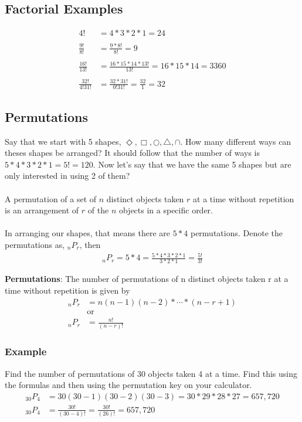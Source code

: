 \documentclass[14pt]{extarticle}
\begin{document}
\subsection{Factorial Examples}
\begin{align*}
	4! &= 4*3*2*1 = 24 \\\\
	\frac{9!}{8!} &= \frac{9*8!}{8!} = 9 \\\\
	\frac{16!}{13!} &= \frac{16*15*14*13!}{13!}= 16*15*14 = 3360 \\\\
	\frac{32!}{4!31!} &= \frac{32*31!}{0!31!}= \frac{32}{1} = 32
\end{align*}


\subsection{Permutations}
Say that we start with 5 shapes, $\Diamond, \Box, \bigcirc, \bigtriangleup, \cap$. How many different ways can theses shapes be arranged? It should follow that the number of ways is $5*4*3*2*1 = 5! = 120$. Now let's say that we have the same 5 shapes but are only interested in using 2 of them? 
\\\\
A permutation of a set of $n$ distinct objects taken $r$ at a time without repetition is an arrangement of $r$ of the $n$ objects in a specific order.
\\\\
In arranging our shapes, that means there are $5*4$ permutations. Denote the permutations as, $_nP_r$, then
\begin{align*}
	_nP_r = 5*4 = \frac{5*4*3*2*1}{3*2*1} = \frac{5!}{3!}
\end{align*}
\begin{tcolorbox}[enhanced jigsaw,colback=bg,boxrule=0pt,arc=0pt] 
	\textbf{Permutations}: The number of permutations of n distinct objects taken r at a time without repetition is given by
	\begin{align*}
		_nP_r &= n(n-1)(n-2)* \cdots *(n-r+1)\\
		&\text{or} \\
		_nP_r &= \frac{n!}{(n-r)!}
	\end{align*}
\end{tcolorbox}

\subsubsection{Example}
Find the number of permutations of 30 objects taken 4 at a time. Find this using the formulas and then using the permutation key on your calculator.
\begin{align*}
	_{30}P_4 &= 30(30-1)(30-2)(30-3) = 30*29*28*27 = 657,720 \\
	_{30}P_4 &= \frac{30!}{(30-4)!} = \frac{30!}{(26)!} = 657,720
\end{align*}
\end{document}
